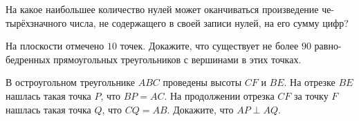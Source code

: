 \documentclass{article}
\begin{document}
\begin{enumerate_boxed}
        \item На какое наибольшее количество нулей может оканчиваться произведение че- тырёхзначного числа, не содержащего в своей записи нулей, на его сумму цифр?

        \item На плоскости отмечено $10$ точек.
        Докажите, что существует не более $90$ равно- бедренных прямоугольных треугольников с вершинами в этих точках.

        \item В остроугольном треугольнике $ABC$ проведены высоты $CF$ и $BE$.
        На отрезке $BE$ нашлась такая точка $P$, что $BP = AC$.
        На продолжении отрезка $CF$ за точку $F$ нашлась такая точка $Q$, что $CQ = AB$.
        Докажите, что $AP \perp AQ$.

    \end{enumerate_boxed}
\end{document}
